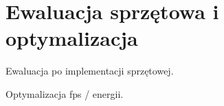 \chapter{Ewaluacja sprzętowa i optymalizacja}
\label{cha:Optymalizacja}

Ewaluacja po implementacji sprzętowej. 

Optymalizacja fps / energii.

